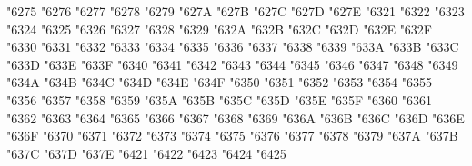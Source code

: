 {\Uchar\jis"6275 %
\Uchar\jis"6276 %
\Uchar\jis"6277 %
\Uchar\jis"6278 %
\Uchar\jis"6279 %
\Uchar\jis"627A %
\Uchar\jis"627B %
\Uchar\jis"627C %
\Uchar\jis"627D %
\Uchar\jis"627E %
\Uchar\jis"6321 %
\Uchar\jis"6322 %
\Uchar\jis"6323 %
\Uchar\jis"6324 %
\Uchar\jis"6325 %
\Uchar\jis"6326 %
\Uchar\jis"6327 %
\Uchar\jis"6328 %
\Uchar\jis"6329 %
\Uchar\jis"632A %
\Uchar\jis"632B %
\Uchar\jis"632C %
\Uchar\jis"632D %
\Uchar\jis"632E %
\Uchar\jis"632F %
\Uchar\jis"6330 %
\Uchar\jis"6331 %
\Uchar\jis"6332 %
\Uchar\jis"6333 %
\Uchar\jis"6334 %
\Uchar\jis"6335 %
\Uchar\jis"6336 %
\Uchar\jis"6337 %
\Uchar\jis"6338 %
\Uchar\jis"6339 %
\Uchar\jis"633A %
\Uchar\jis"633B %
\Uchar\jis"633C %
\Uchar\jis"633D %
\Uchar\jis"633E %
\Uchar\jis"633F %
\Uchar\jis"6340 %
\Uchar\jis"6341 %
\Uchar\jis"6342 %
\Uchar\jis"6343 %
\Uchar\jis"6344 %
\Uchar\jis"6345 %
\Uchar\jis"6346 %
\Uchar\jis"6347 %
\Uchar\jis"6348 %
\Uchar\jis"6349 %
\Uchar\jis"634A %
\Uchar\jis"634B %
\Uchar\jis"634C %
\Uchar\jis"634D %
\Uchar\jis"634E %
\Uchar\jis"634F %
\Uchar\jis"6350 %
\Uchar\jis"6351 %
\Uchar\jis"6352 %
\Uchar\jis"6353 %
\Uchar\jis"6354 %
\Uchar\jis"6355 %
\Uchar\jis"6356 %
\Uchar\jis"6357 %
\Uchar\jis"6358 %
\Uchar\jis"6359 %
\Uchar\jis"635A %
\Uchar\jis"635B %
\Uchar\jis"635C %
\Uchar\jis"635D %
\Uchar\jis"635E %
\Uchar\jis"635F %
\Uchar\jis"6360 %
\Uchar\jis"6361 %
\Uchar\jis"6362 %
\Uchar\jis"6363 %
\Uchar\jis"6364 %
\Uchar\jis"6365 %
\Uchar\jis"6366 %
\Uchar\jis"6367 %
\Uchar\jis"6368 %
\Uchar\jis"6369 %
\Uchar\jis"636A %
\Uchar\jis"636B %
\Uchar\jis"636C %
\Uchar\jis"636D %
\Uchar\jis"636E %
\Uchar\jis"636F %
\Uchar\jis"6370 %
\Uchar\jis"6371 %
\Uchar\jis"6372 %
\Uchar\jis"6373 %
\Uchar\jis"6374 %
\Uchar\jis"6375 %
\Uchar\jis"6376 %
\Uchar\jis"6377 %
\Uchar\jis"6378 %
\Uchar\jis"6379 %
\Uchar\jis"637A %
\Uchar\jis"637B %
\Uchar\jis"637C %
\Uchar\jis"637D %
\Uchar\jis"637E %
\Uchar\jis"6421 %
\Uchar\jis"6422 %
\Uchar\jis"6423 %
\Uchar\jis"6424 %
\Uchar\jis"6425 %
}
